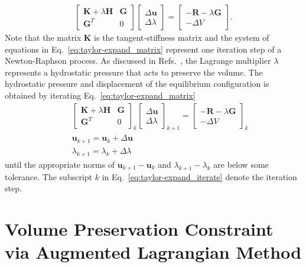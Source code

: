 \documentclass[12pt,aps,pre]{revtex4}
\begin{document}
%
\begin{eqnarray}
\begin{bmatrix}
\textbf{K} + \lambda \textbf{H} & \textbf{G} \\
\textbf{G}^T & 0 
\end{bmatrix}
%
\begin{bmatrix}
\Delta \textbf{u} \\ \Delta \lambda
\end{bmatrix}
%
= \begin{bmatrix}
-\textbf{R}-\lambda \textbf{G} \\
- \Delta V 
\end{bmatrix}.
\label{eq:taylor-expand_matrix}
\end{eqnarray}
%
Note that the matrix \textbf{K} is the tangent-stiffness matrix and the system of equations in Eq.\ \eqref{eq:taylor-expand_matrix} represent one iteration step of a Newton-Raphson process. As discussed in Refs.\ \cite{Hirota:2000jw,Lai:2013fp}, the Lagrange multiplier $\lambda$ represents a hydrostatic pressure that acts to preserve the volume. The hydrostatic pressure and displacement of the equilibrium configuration is obtained by iterating Eq.\ \eqref{eq:taylor-expand_matrix}
%
\begin{eqnarray}
&&\begin{bmatrix}
\textbf{K} + \lambda \textbf{H} & \textbf{G} \\
\textbf{G}^T & 0 
\end{bmatrix}_k
%
\begin{bmatrix}
\Delta \textbf{u} \\ \Delta \lambda
\end{bmatrix}_{k+1}
%
= \begin{bmatrix}
-\textbf{R}-\lambda \textbf{G} \\
- \Delta V 
\end{bmatrix}_k \nonumber\\
%
&&\textbf{u}_{k+1} = \textbf{u}_k + \Delta \textbf{u} \nonumber\\
%
&&\lambda_{k+1} = \lambda_k + \Delta \lambda
\label{eq:taylor-expand_iterate}
\end{eqnarray}
%
until the appropriate norms of $\textbf{u}_{k+1} - \textbf{u}_k$ and $\lambda_{k+1} - \lambda_k$ are below some tolerance. The subscript $k$ in Eq.\ \eqref{eq:taylor-expand_iterate} denote the iteration step.

\section{Volume Preservation Constraint via Augmented Lagrangian Method}
\end{document}

